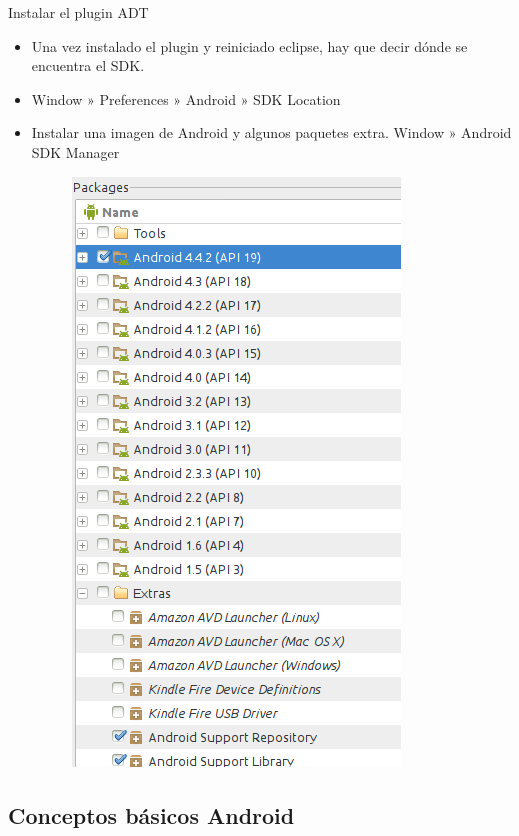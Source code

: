 \documentclass{beamer}
\begin{document}
\begin{frame}{Instalar el plugin ADT}{}
  \begin{itemize}
  \item {
    Una vez instalado el plugin y reiniciado eclipse, hay que decir dónde se encuentra el SDK.
  }
  \item {
    Window » Preferences » Android » SDK Location
  }
  \item{
    Instalar una imagen de Android y algunos paquetes extra.
    Window » Android SDK Manager
  }
  \begin{figure}[H]
    \centering
    \includegraphics[scale=.25]{./img/sdkmanager.png}
    \end{figure}
  \end{itemize}
\end{frame}

\subsection{Conceptos básicos Android}
\end{document}
